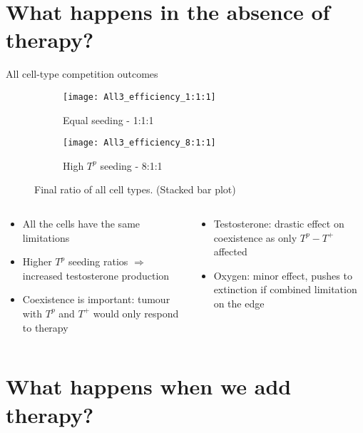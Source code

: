 \section{What happens in the absence of therapy?}

\begin{frame}{All cell-type competition outcomes}
  \begin{figure}[h]
    \begin{adjustwidth}{-5cm}{-5cm}
      \centering
      \begin{subfigure}[b]{0.53\textwidth}
        \centering
        \texttt{[image: All3\_efficiency\_1:1:1]}
        \caption{Equal seeding - 1:1:1 }
      \end{subfigure}
      \begin{subfigure}[b]{0.53\textwidth}
        \centering
        \texttt{[image: All3\_efficiency\_8:1:1]}
        \caption{High $T^p$ seeding - 8:1:1}
      \end{subfigure}
    \end{adjustwidth}
    \caption{Final ratio of all cell types. (Stacked bar plot)}
  \end{figure}
  \begin{columns}
    \begin{column}{0.5\textwidth}
      \begin{itemize}
        \item<1-> All the cells have the same limitations
        \item<2-> Higher $T^p$ seeding ratios $\Rightarrow$ increased testosterone production
        \item<3-> Coexistence is important: tumour with $T^p$ and $T^+$ would only respond to therapy
      \end{itemize}
    \end{column}
    \begin{column}{0.5\textwidth}
      \begin{itemize}
        \item<4-> Testosterone: drastic effect on coexistence as only $T^p -T^+$ affected
        \item<5-> Oxygen: minor effect, pushes to extinction if combined limitation on the edge
      \end{itemize}
    \end{column}
  \end{columns}
\end{frame}

\section{What happens when we add therapy?}

